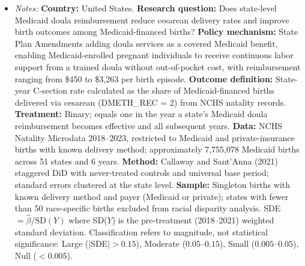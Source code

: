 \begin{table}[t]
\begin{minipage}{0.95\textwidth}
\begin{itemize}[leftmargin=*,nosep]
\item \textit{Notes:} \textbf{Country:} United States. \textbf{Research question:} Does state-level Medicaid doula reimbursement reduce cesarean delivery rates and improve birth outcomes among Medicaid-financed births? \textbf{Policy mechanism:} State Plan Amendments adding doula services as a covered Medicaid benefit, enabling Medicaid-enrolled pregnant individuals to receive continuous labor support from a trained doula without out-of-pocket cost, with reimbursement ranging from \$450 to \$3,263 per birth episode. \textbf{Outcome definition:} State-year C-section rate calculated as the share of Medicaid-financed births delivered via cesarean (DMETH\_REC = 2) from NCHS natality records. \textbf{Treatment:} Binary; equals one in the year a state's Medicaid doula reimbursement becomes effective and all subsequent years. \textbf{Data:} NCHS Natality Microdata 2018--2023, restricted to Medicaid and private-insurance births with known delivery method; approximately 7,755,078 Medicaid births across 51 states and 6 years. \textbf{Method:} Callaway and Sant'Anna (2021) staggered DiD with never-treated controls and universal base period; standard errors clustered at the state level. \textbf{Sample:} Singleton births with known delivery method and payer (Medicaid or private); states with fewer than 50 race-specific births excluded from racial disparity analysis. SDE $= \hat{\beta} / \text{SD}(Y)$ where SD($Y$) is the pre-treatment (2018--2021) weighted standard deviation. Classification refers to magnitude, not statistical significance: Large ($|$SDE$| > 0.15$), Moderate ($0.05$--$0.15$), Small ($0.005$--$0.05$), Null ($< 0.005$).
\end{itemize}
\end{minipage}
\end{table}

